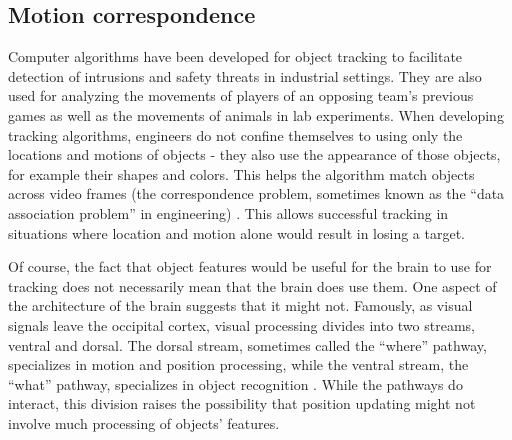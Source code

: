 \documentclass[
]{book}
\begin{document}
\hypertarget{motion-correspondence}{%
\subsection{Motion correspondence}\label{motion-correspondence}}

Computer algorithms have been developed for object tracking to facilitate detection of intrusions and safety threats in industrial settings. They are also used for analyzing the movements of players of an opposing team's previous games as well as the movements of animals in lab experiments. When developing tracking algorithms, engineers do not confine themselves to using only the locations and motions of objects - they also use the appearance of those objects, for example their shapes and colors. This helps the algorithm match objects across video frames (the correspondence problem, sometimes known as the ``data association problem'' in engineering) \citep{yilmazObjectTrackingSurvey2006a}. This allows successful tracking in situations where location and motion alone would result in losing a target.

Of course, the fact that object features would be useful for the brain to use for tracking does not necessarily mean that the brain does use them. One aspect of the architecture of the brain suggests that it might not. Famously, as visual signals leave the occipital cortex, visual processing divides into two streams, ventral and dorsal. The dorsal stream, sometimes called the ``where'' pathway, specializes in motion and position processing, while the ventral stream, the ``what'' pathway, specializes in object recognition \citep{goodaleSeparateVisualPathways1992}. While the pathways do interact, this division raises the possibility that position updating might not involve much processing of objects' features.
\end{document}
